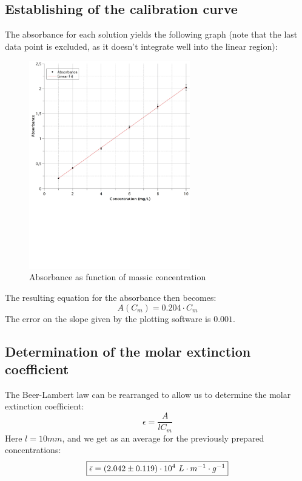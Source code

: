 \documentclass[twocolumn]{article}
\begin{document}
\subsection{Establishing of the calibration curve}
The absorbance for each solution yields the following graph (note that the last data point is excluded, as it doesn't integrate well into the linear region):
\begin{figure}[!htbp]
    \centering
    \includegraphics[width=7cm]{CalibrationCurve.eps}
    \caption{Absorbance as function of massic concentration}
    \label{fig:my_label}
\end{figure} \FloatBarrier The resulting equation for the absorbance then becomes: 
\[\boxed{A(C_m)= 0.204 \cdot C_m}\]
The error on the slope given by the plotting software is  $0.001$.
\subsection{Determination of the molar extinction coefficient}
The Beer-Lambert law can be rearranged to allow us to determine the molar extinction coefficient:
\begin{equation}
    \epsilon = \frac{A}{lC_m}
\end{equation}
Here $l=10mm$, and we get as an average for the previously prepared concentrations: \[\boxed{\Bar{\epsilon} = (2.042 \pm 0.119) \cdot 10^4 \ L \cdot m^{-1} \cdot g^{-1}}\]
\end{document}
